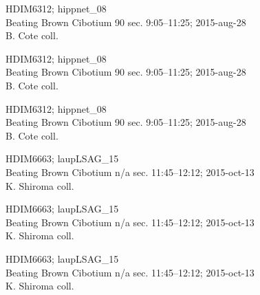 \documentclass[2pt]{extarticle}
\begin{document}
\noindent
\parbox{0.16\textwidth}{\tiny \raggedright \rule[-0.3\baselineskip]{0pt}{10pt}HDIM6312; hippnet\_08\\ Beating Brown Cibotium 90 sec. 9:05--11:25; 2015-aug-28\\ B. Cote coll.}
\parbox{0.16\textwidth}{\tiny \raggedright \rule[-0.3\baselineskip]{0pt}{10pt}HDIM6312; hippnet\_08\\ Beating Brown Cibotium 90 sec. 9:05--11:25; 2015-aug-28\\ B. Cote coll.}
\parbox{0.16\textwidth}{\tiny \raggedright \rule[-0.3\baselineskip]{0pt}{10pt}HDIM6312; hippnet\_08\\ Beating Brown Cibotium 90 sec. 9:05--11:25; 2015-aug-28\\ B. Cote coll.}
\parbox{0.16\textwidth}{\tiny \raggedright \rule[-0.3\baselineskip]{0pt}{10pt}HDIM6663; laupLSAG\_15\\ Beating Brown Cibotium n/a sec. 11:45--12:12; 2015-oct-13\\ K. Shiroma coll.}
\parbox{0.16\textwidth}{\tiny \raggedright \rule[-0.3\baselineskip]{0pt}{10pt}HDIM6663; laupLSAG\_15\\ Beating Brown Cibotium n/a sec. 11:45--12:12; 2015-oct-13\\ K. Shiroma coll.}
\parbox{0.16\textwidth}{\tiny \raggedright \rule[-0.3\baselineskip]{0pt}{10pt}HDIM6663; laupLSAG\_15\\ Beating Brown Cibotium n/a sec. 11:45--12:12; 2015-oct-13\\ K. Shiroma coll.} \\ 
\vspace{0.001in} 
\end{document}
